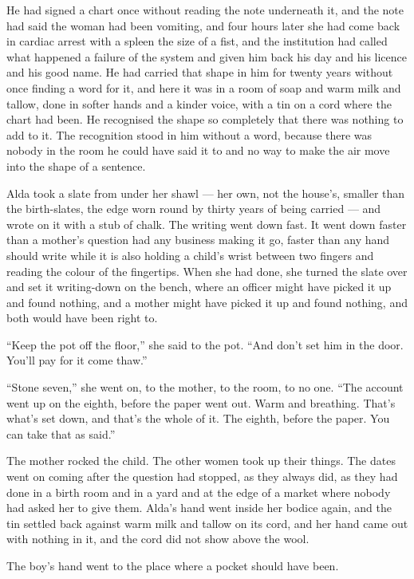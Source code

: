 He had signed a chart once without reading the note underneath it, and the note had said the woman had been vomiting, and four hours later she had come back in cardiac arrest with a spleen the size of a fist, and the institution had called what happened a failure of the system and given him back his day and his licence and his good name. He had carried that shape in him for twenty years without once finding a word for it, and here it was in a room of soap and warm milk and tallow, done in softer hands and a kinder voice, with a tin on a cord where the chart had been. He recognised the shape so completely that there was nothing to add to it. The recognition stood in him without a word, because there was nobody in the room he could have said it to and no way to make the air move into the shape of a sentence.

\scenebreak

Alda took a slate from under her shawl --- her own, not the house's, smaller than the birth-slates, the edge worn round by thirty years of being carried --- and wrote on it with a stub of chalk. The writing went down fast. It went down faster than a mother's question had any business making it go, faster than any hand should write while it is also holding a child's wrist between two fingers and reading the colour of the fingertips. When she had done, she turned the slate over and set it writing-down on the bench, where an officer might have picked it up and found nothing, and a mother might have picked it up and found nothing, and both would have been right to.

“Keep the pot off the floor,” she said to the pot. “And don't set him in the door. You'll pay for it come thaw.”

“Stone seven,” she went on, to the mother, to the room, to no one. “The account went up on the eighth, before the paper went out. Warm and breathing. That's what's set down, and that's the whole of it. The eighth, before the paper. You can take that as said.”

The mother rocked the child. The other women took up their things. The dates went on coming after the question had stopped, as they always did, as they had done in a birth room and in a yard and at the edge of a market where nobody had asked her to give them. Alda's hand went inside her bodice again, and the tin settled back against warm milk and tallow on its cord, and her hand came out with nothing in it, and the cord did not show above the wool.

The boy's hand went to the place where a pocket should have been.

